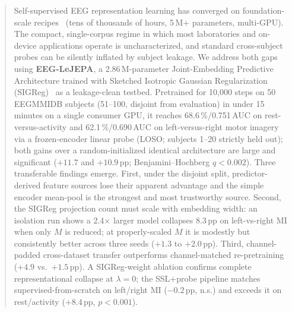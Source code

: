 \begin{abstract}

Self-supervised EEG representation learning has converged on foundation-scale recipes~\cite{labram2024,eegpt2024,neurolm2025,laya2026} (tens of thousands of hours, 5\,M$+$ parameters, multi-GPU). The compact, single-corpus regime in which most laboratories and on-device applications operate is uncharacterized, and standard cross-subject probes can be silently inflated by subject leakage. We address both gaps using \textbf{EEG-LeJEPA}, a 2.86\,M-parameter Joint-Embedding Predictive Architecture trained with Sketched Isotropic Gaussian Regularization (SIGReg)~\cite{lejepa2025} as a leakage-clean testbed. Pretrained for 10{,}000 steps on 50 EEGMMIDB subjects (51--100, disjoint from evaluation) in under 15 minutes on a single consumer GPU, it reaches 68.6\,\%/0.751\,AUC on rest-versus-activity and 62.1\,\%/0.690\,AUC on left-versus-right motor imagery via a frozen-encoder linear probe (LOSO; subjects 1--20 strictly held out); both gains over a random-initialized identical architecture are large and significant ($+11.7$ and $+10.9$\,pp; Benjamini--Hochberg $q<0.002$). Three transferable findings emerge. First, under the disjoint split, predictor-derived feature sources lose their apparent advantage and the simple encoder mean-pool is the strongest and most trustworthy source. Second, the SIGReg projection count must scale with embedding width: an isolation run shows a 2.4$\times$ larger model collapses 8.3\,pp on left-vs-right MI when only $M$ is reduced; at properly-scaled $M$ it is modestly but consistently better across three seeds ($+1.3$ to $+2.0$\,pp). Third, channel-padded cross-dataset transfer outperforms channel-matched re-pretraining ($+4.9$ vs.\ $+1.5$\,pp). A SIGReg-weight ablation confirms complete representational collapse at $\lambda{=}0$; the SSL$+$probe pipeline matches supervised-from-scratch on left/right MI ($-0.2$\,pp, n.s.) and exceeds it on rest/activity ($+8.4$\,pp, $p<0.001$).
\end{abstract}
